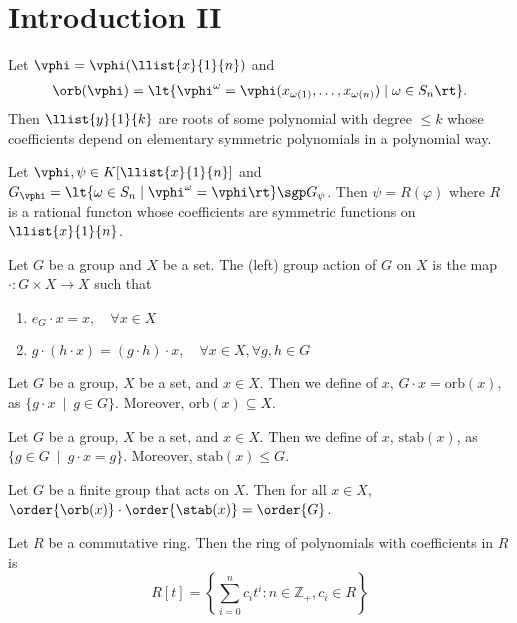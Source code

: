 \documentclass[a4paper]{article}
\begin{document}
\section{Introduction II}
\begin{ttheorem}[Lagrange]
  Let $ \vphi=\vphi(\llist{x}{1}{n}) $ and \begin{align*}
    \orb(\vphi) = \lt\{ \vphi^\omega = \vphi(x_{\omega(1)},\ldots,x_{\omega(n)}) \mid\omega\in S_n \rt\}.
  \end{align*}
  Then $ \llist{y}{1}{k} $ are roots of some polynomial with degree $ \leq k $ whose coefficients depend on elementary symmetric polynomials  in a polynomial way.
\end{ttheorem}

\begin{ttheorem}[Lagrange]
  Let $ \vphi,\psi\in K[\llist{x}{1}{n}] $ and $ G_\vphi=\lt\{ \omega\in S_n \mid \vphi^\omega=\vphi \rt\} \sgp G_\psi $.
  Then $ \psi = R(\varphi) $ where $ R $ is a rational functon whose coefficients are symmetric functions on $ \llist{x}{1}{n} $.
\end{ttheorem}

\begin{tdefinition}
  Let \(G\) be a group and \(X\) be a set. The (left) group action of \(G\) on \(X\) is the map \(\cdot:G\times X\to X\) such that \begin{enumerate}
    \item \(e_G\cdot x = x, \quad \forall x\in X\)
    \item \(g\cdot (h\cdot x)=(g\cdot h)\cdot x,\quad \forall x\in X,\forall g,h\in G\)
  \end{enumerate}
\end{tdefinition}

\begin{tdefinition}[Orbit]
  Let \(G\) be a group, \(X\) be a set, and \(x\in X\).
  Then we define  of \(x\), \(G\cdot x = \text{orb}(x)\), as \(\{g\cdot x \ \mid \ g\in G\}\).
  Moreover, \(\text{orb}(x)\subseteq X\).
\end{tdefinition}

\begin{tdefinition}[Stabilizer]
  Let \(G\) be a group, \(X\) be a set, and \(x\in X\).
  Then we define  of \(x\), \(\text{stab}(x)\), as \(\{g\in G \ \mid \ g\cdot x = g\}\).
  Moreover, \(\text{stab}(x)\leq G\).
\end{tdefinition}

\begin{ttheorem}
  Let $ G $ be a finite group that acts on $ X $. Then for all $ x\in X $, $ \order{\orb(x)} \cdot \order{\stab(x)} = \order{G} $.
\end{ttheorem}

\begin{tdefinition}
  Let \(R\) be a commutative ring. Then the ring of polynomials with coefficients in \(R\) is \[R[t] = \left\{\sum_{i=0}^n c_it^i : n\in\mathbb{Z}_+, c_i\in R\right\}\]
\end{tdefinition}
\end{document}
